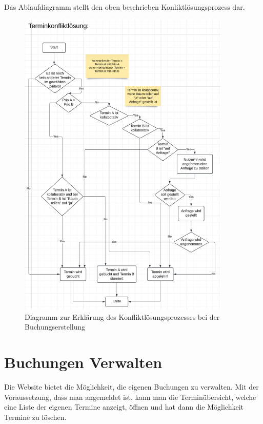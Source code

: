 Das Ablaufdiagramm stellt den oben beschrieben Konliktlösungsprozess dar.

\begin{figure}[ht]
    \centering
    \includegraphics[width=0.9\textwidth]{figures/activity/terminkonfliktloesung}
    \caption{Diagramm zur Erklärung des Konfliktlösungsprozesses bei der Buchungserstellung}
    \label{fig:resolve-conflict-diagram}
\end{figure}
\clearpage

\section{Buchungen Verwalten}

Die Website bietet die Möglichkeit, die eigenen Buchungen zu verwalten. Mit der Voraussetzung,
dass man angemeldet ist, kann man die Terminübersicht, welche eine Liste der eigenen Termine anzeigt,
öffnen und hat dann die Möglichkeit Termine zu löschen.

